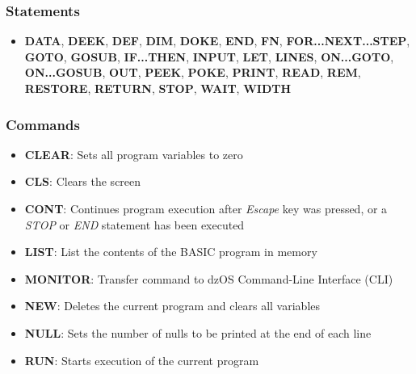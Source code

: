 \documentclass[a4paper,11pt]{article}
\begin{document}
    \subsubsection{Statements}

    \begin{itemize}
        \item \textbf{DATA}, \textbf{DEEK}, \textbf{DEF}, \textbf{DIM},
        \textbf{DOKE}, \textbf{END}, \textbf{FN}, \textbf{FOR...NEXT...STEP},
        \textbf{GOTO}, \textbf{GOSUB}, \textbf{IF...THEN}, \textbf{INPUT},
        \textbf{LET}, \textbf{LINES}, \textbf{ON...GOTO}, \textbf{ON...GOSUB},
        \textbf{OUT}, \textbf{PEEK}, \textbf{POKE}, \textbf{PRINT},
        \textbf{READ}, \textbf{REM}, \textbf{RESTORE}, \textbf{RETURN},
        \textbf{STOP}, \textbf{WAIT}, \textbf{WIDTH}
    \end{itemize}

    \subsubsection{Commands}

    \begin{itemize}
        \item \textbf{CLEAR}: Sets all program variables to zero
        \item \textbf{CLS}: Clears the screen
        \item \textbf{CONT}: Continues program execution after \textit{Escape}
        key was pressed, or a \textit{STOP} or \textit{END} statement has
        been executed
        \item \textbf{LIST}: List the contents of the BASIC program in memory
        \item \textbf{MONITOR}: Transfer command to dzOS Command-Line
        Interface (CLI)
        \item \textbf{NEW}: Deletes the current program and clears all
        variables
        \item \textbf{NULL}: Sets the number of nulls to be printed at the
        end of each line
        \item \textbf{RUN}: Starts execution of the current program
    \end{itemize}
\end{document}
